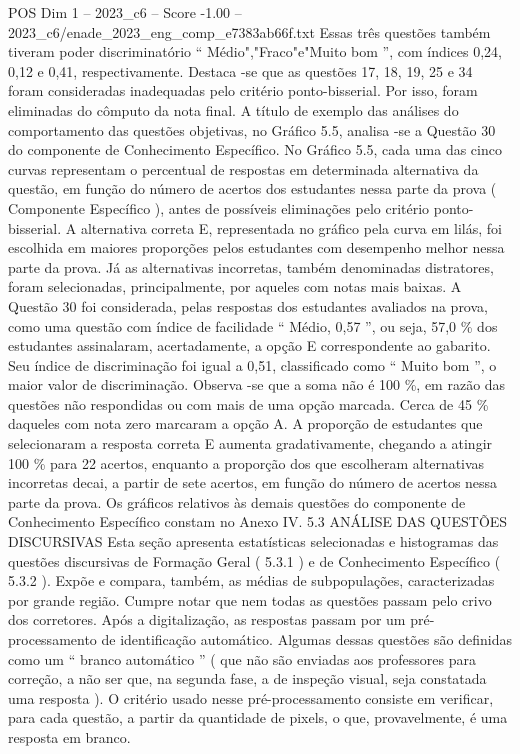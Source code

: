 \begin{textsample}{POS Dim 1 – 2023\_c6 – Score -1.00 – 2023\_c6/enade\_2023\_eng\_comp\_e7383ab66f.txt}
Essas três questões também tiveram poder discriminatório “ Médio","Fraco"e"Muito bom ”, com índices 0,24, 0,12 e 0,41, respectivamente.
Destaca -se que as questões 17, 18, 19, 25 e 34 foram consideradas inadequadas pelo critério ponto-bisserial.
Por isso, foram eliminadas do cômputo da nota final.
A título de exemplo das análises do comportamento das questões objetivas, no Gráfico 5.5, analisa -se a Questão 30 do componente de Conhecimento Específico.
No Gráfico 5.5, cada uma das cinco curvas representam o percentual de respostas em determinada alternativa da questão, em função do número de acertos dos estudantes nessa parte da prova ( Componente Específico ), antes de possíveis eliminações pelo critério ponto-bisserial.
A alternativa correta E, representada no gráfico pela curva em lilás, foi escolhida em maiores proporções pelos estudantes com desempenho melhor nessa parte da prova.
Já as alternativas incorretas, também denominadas distratores, foram selecionadas, principalmente, por aqueles com notas mais baixas.
A Questão 30 foi considerada, pelas respostas dos estudantes avaliados na prova, como uma questão com índice de facilidade “ Médio, 0,57 ”, ou seja, 57,0 \% dos estudantes assinalaram, acertadamente, a opção E correspondente ao gabarito.
Seu índice de discriminação foi igual a 0,51, classificado como “ Muito bom ”, o maior valor de discriminação.
Observa -se que a soma não é 100 \%, em razão das questões não respondidas ou com mais de uma opção marcada.
Cerca de 45 \% daqueles com nota zero marcaram a opção A.
A proporção de estudantes que selecionaram a resposta correta E aumenta gradativamente, chegando a atingir 100 \% para 22 acertos, enquanto a proporção dos que escolheram alternativas incorretas decai, a partir de sete acertos, em função do número de acertos nessa parte da prova.
Os gráficos relativos às demais questões do componente de Conhecimento Específico constam no Anexo IV. 5.3 ANÁLISE DAS QUESTÕES DISCURSIVAS Esta seção apresenta estatísticas selecionadas e histogramas das questões discursivas de Formação Geral ( 5.3.1 ) e de Conhecimento Específico ( 5.3.2 ).
Expõe e compara, também, as médias de subpopulações, caracterizadas por grande região.
Cumpre notar que nem todas as questões passam pelo crivo dos corretores.
Após a digitalização, as respostas passam por um pré-processamento de identificação automático.
Algumas dessas questões são definidas como um “ branco automático ” ( que não são enviadas aos professores para correção, a não ser que, na segunda fase, a de inspeção visual, seja constatada uma resposta ).
O critério usado nesse pré-processamento consiste em verificar, para cada questão, a partir da quantidade de pixels, o que, provavelmente, é uma resposta em branco.

\end{textsample}
